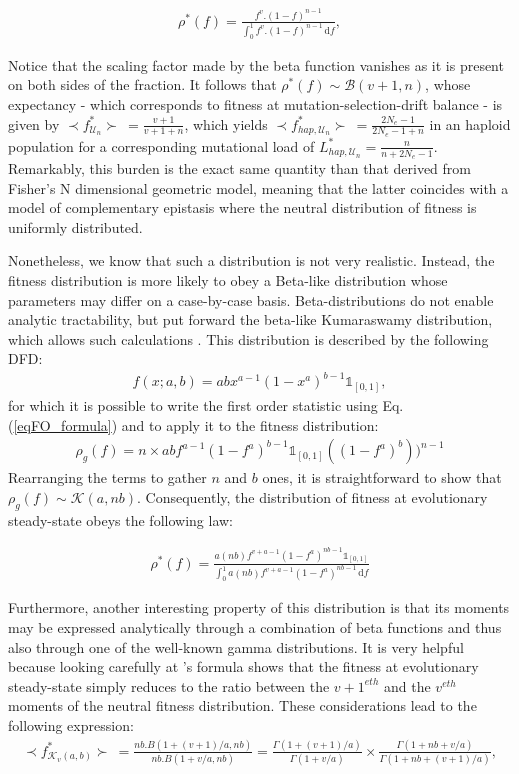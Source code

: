 \begin{align}
 \rho^*(f)   = \frac{f^v.(1-f)^{n-1}}{ \int_{0}^{1} f^v.(1-f)^{n-1} \, \mathrm{d}f },
\end{align}

Notice that the scaling factor made by the beta function vanishes as it is present on both sides of the fraction. It follows that $\rho^*(f) \sim \mathcal{B}(v+1,n)$, whose expectancy - which corresponds to fitness at mutation-selection-drift balance - is given by $\prec f^*_{\mathcal{U}_n} \succ~=\frac{v+1}{v+1+n}$, which yields $\prec f^*_{hap,\mathcal{U}_n} \succ~=\frac{2N_e-1}{2N_e-1+n}$ in an haploid population for a corresponding mutational load of $L^*_{hap,\mathcal{U}_n}=\frac{n}{n+2N_e-1}$. Remarkably, this burden is the exact same quantity than that derived from Fisher's N dimensional geometric model, meaning that the latter coincides with a model of complementary epistasis where the neutral distribution of fitness is uniformly distributed.

Nonetheless, we know that such a distribution is not very realistic. Instead, the fitness distribution is more likely to obey a Beta-like distribution whose parameters may differ on a case-by-case basis. Beta-distributions do not enable analytic tractability, but \citet{Kumaraswamy80} put forward the beta-like Kumaraswamy distribution, which allows such calculations \citep{Jones09}. This distribution is described by the following DFD:
\begin{align*}
    f(x;a,b)=abx^{a-1}(1-x^a)^{b-1} \mathds{1}_{[0,1]},
\end{align*}
for which it is possible to write the first order statistic using Eq.(\ref{eqFO_formula}) and to apply it to the fitness distribution:
\begin{align*}
    \rho_g(f)=n\times abf^{a-1}(1-f^a)^{b-1}\mathds{1}_{[0,1]} ((1-f^a)^b))^{n-1}
\end{align*}
Rearranging the terms to gather $n$ and $b$ ones, it is straightforward to show that $\rho_g(f) \sim \mathcal{K}(a,nb)$. Consequently, the distribution of fitness at evolutionary steady-state obeys the following law:

\begin{align}
    \rho^*(f)   = \frac{a(nb)f^{v+a-1}(1-f^a)^{nb-1} \mathds{1}_{[0,1]}}{\int_{0}^{1} a(nb)f^{v+a-1}(1-f^a)^{nb-1} \, \mathrm{d}f}
\end{align}

Furthermore, another interesting property of this distribution is that its moments may be expressed analytically through a combination of beta functions and thus also through one of the well-known gamma distributions. It is very helpful because looking carefully at \citet{Sella05}'s formula shows that the fitness at evolutionary steady-state simply reduces to the ratio between the $v+1^{eth}$ and the $v^{eth}$ moments of the neutral fitness distribution. These considerations lead to the following expression:
\begin{align}
    \prec f^*_{\mathcal{K}_v(a,b)} \succ~=\frac{nb. B(1+(v+1)/a,nb)}{nb. B(1+v/a,nb)}=\frac{\Gamma (1+(v+1)/a)}{\Gamma(1+v/a)} \times \frac{\Gamma (1+nb+v/a)}{\Gamma(1+nb+(v+1)/a)},
    \label{feq_Kumar}
\end{align}

